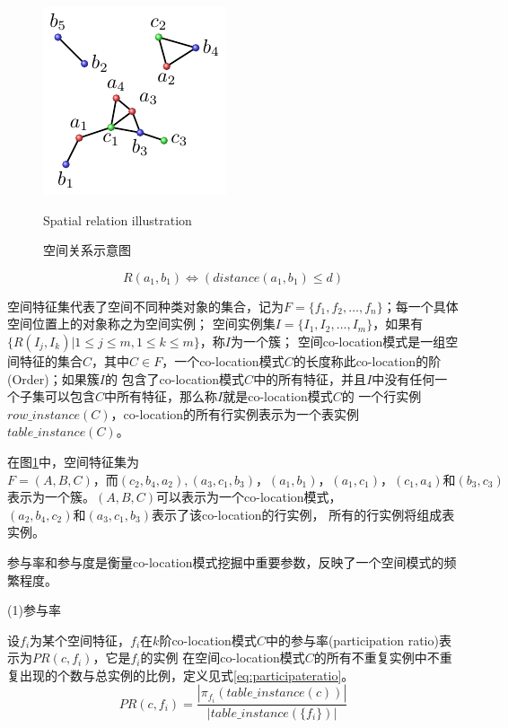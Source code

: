 \begin{figure}
\centering
\includegraphics[width=0.3 \linewidth]{figures/spatialrelation.pdf}
\caption{空间关系示意图}{Spatial relation illustration}
\label{fig:spaitalrelation}
\end{figure}
\begin{equation}
\label{eq:colation}
 R(a_1,b_1) \Leftrightarrow (distance(a_1,b_1)\le d)
\end{equation}

空间特征集代表了空间不同种类对象的集合，记为$F=\{f_1,f_2,\ldots,f_n \}$；每一个具体空间位置上的对象称之为空间实例；
空间实例集$I=\{I_1,I_2,\ldots,I_m\}$，如果有$\{R(I_j,I_k) | 1 \le j \le m, 1 \le k \le m\}$，称$I$为一个簇；
空间co-location模式是一组空间特征的集合$C$，其中$C\in F$，一个co-location模式$C$的长度称此co-location的阶(Order)；如果簇$I$的
包含了co-location模式$C$中的所有特征，并且$I$中没有任何一个子集可以包含$C$中所有特征，那么称$I$就是co-location模式$C$的
一个行实例$row\_instance(C)$，co-location的所有行实例表示为一个表实例$table\_instance(C)$。

在图\ref{fig:spaitalrelation}中，空间特征集为$F=(A,B,C)\text{，而}\allowbreak (c_2,b_4,a_2),\allowbreak (a_3,c_1,b_3)\text{，} \allowbreak (a_1,b_1) \text{，} \allowbreak (a_1,c_1)\text{，} \allowbreak (c_1,a_4)\text{和}(b_3,c_3)$
表示为一个簇。$(A,B,C)$可以表示为一个co-location模式，$(a_2,b_4,c_2)\text{和}(a_3,c_1,b_3)$表示了该co-location的行实例，
所有的行实例将组成表实例。

参与率和参与度是衡量co-location模式挖掘中重要参数，反映了一个空间模式的频繁程度。

(1)参与率

设$f_i$为某个空间特征，$f_i$在$k$阶co-location模式$C$中的参与率(participation ratio)表示为$PR(c, f_i)$，它是$f_i$的实例
在空间co-location模式$C$的所有不重复实例中不重复出现的个数与总实例的比例，定义见式\eqref{eq:participateratio}。
\begin{equation}
\label{eq:participateratio}
PR(c,f_i)=\frac{|\pi_{f_i}(table\_instance(c))|}{|table\_instance(\{f_i\})|}
\end{equation}

